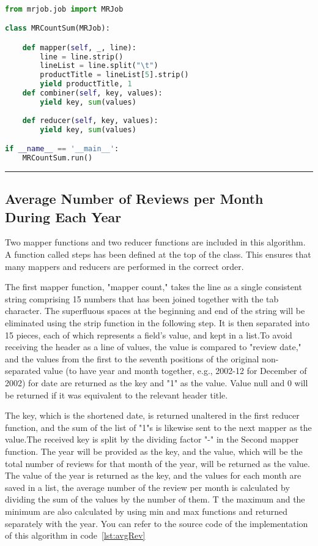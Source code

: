 \renewcommand{\lstlistingname}{Code}
\lstset{style=mystyle}
\begin{lstlisting}[language=Python, caption={Number of Reviews for each Product}, label={lst:reviewsProduct}, mathescape = true, breaklines=true]

from mrjob.job import MRJob

class MRCountSum(MRJob):

    def mapper(self, _, line):
        line = line.strip()  
        lineList = line.split("\t")
        productTitle = lineList[5].strip()
        yield productTitle, 1
    def combiner(self, key, values):
        yield key, sum(values)
        
    def reducer(self, key, values):
        yield key, sum(values)

if __name__ == '__main__':
    MRCountSum.run()

\end{lstlisting}

\rule{200 pt}{0.5 pt} 

\subsection{Average Number of Reviews per Month During Each Year} 
Two mapper functions and two reducer functions are included in this algorithm. A function called steps has been defined at the top of the class. This ensures that many mappers and reducers are performed in the correct order.

The first mapper function, "mapper count," takes the line as a single consistent string comprising 15 numbers that has been joined together with the tab character. The superfluous spaces at the beginning and end of the string will be eliminated using the strip function in the following step. It is then separated into 15 pieces, each of which represents a field's value, and kept in a list.To avoid receiving the header as a line of values, the value is compared to "review date," and the values from the first to the seventh positions of the original non-separated value (to have year and month together, e.g., 2002-12 for December of 2002) for date are returned as the key and "1" as the value. Value null and 0 will be returned if it was equivalent to the relevant header title.

The key, which is the shortened date, is returned unaltered in the first reducer function, and the sum of the list of "1"s is likewise sent to the next mapper as the value.The received key is split by the dividing factor "-" in the Second mapper function. The year will be provided as the key, and the value, which will be the total number of reviews for that month of the year, will be returned as the value. The value of the year is returned as the key, and the values for each month are saved in a list, the average number of the review per month is calculated by dividing the sum of the values by the number of them. T the maximum and the minimum are also calculated by using min and max functions and returned separately with the year. You can refer to the source code of the implementation of this algorithm in code~\ref{lst:avgRev}



